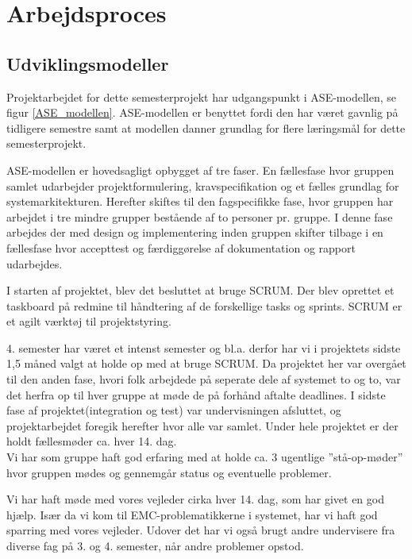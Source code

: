 
\chapter{Arbejdsproces}
\label{arbejdsproces}
\section{Udviklingsmodeller}

Projektarbejdet for dette semesterprojekt har udgangspunkt i ASE-modellen, se figur \ref{ASE_modellen}. ASE-modellen er benyttet fordi den har været gavnlig på tidligere semestre samt at modellen danner grundlag for flere læringsmål for dette semesterprojekt.

ASE-modellen er hovedsagligt opbygget af tre faser. En fællesfase hvor gruppen samlet udarbejder projektformulering, kravspecifikation og et fælles grundlag for systemarkitekturen. Herefter skiftes til den fagspecifikke fase, hvor gruppen har arbejdet i tre mindre grupper bestående af to personer pr. gruppe. I denne fase arbejdes der med design og implementering inden gruppen skifter tilbage i en fællesfase hvor accepttest og færdiggørelse af dokumentation og rapport udarbejdes. 


I starten af projektet, blev det besluttet at bruge SCRUM. Der blev oprettet et taskboard på redmine til håndtering af de forskellige tasks og sprints. SCRUM er et agilt værktøj til projektstyring. 

4. semester har været et intenst semester og bl.a. derfor har vi i projektets sidste 1,5 måned valgt at holde op med at bruge SCRUM. Da projektet her var overgået til den anden fase, hvori folk arbejdede på seperate dele af systemet to og to, var det herfra op til hver gruppe at møde de på forhånd aftalte deadlines. I sidste fase af projektet(integration og test) var undervisningen afsluttet, og projektarbejdet foregik herefter hvor alle var samlet. Under hele projektet er der holdt fællesmøder ca. hver 14. dag.\\
Vi har som gruppe haft god erfaring med at holde ca. 3 ugentlige ''stå-op-møder'' hvor gruppen mødes og gennemgår status og eventuelle problemer.

Vi har haft møde med vores vejleder cirka hver 14. dag, som har givet en god hjælp. Især da vi kom til EMC-problematikkerne i systemet, har vi haft god sparring med vores vejleder. Udover det har vi også brugt andre undervisere fra diverse fag på 3. og 4. semester, når andre problemer opstod.

